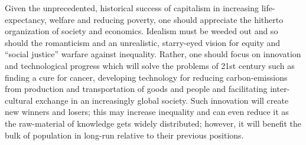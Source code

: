 \documentclass[12pt]{article}
\newcommand{\1}{\mathbbm 1}
\begin{document}
		Given the unprecedented, historical success of capitalism in increasing life-expectancy, welfare and reducing poverty, one should appreciate the hitherto organization of society and economics. Idealism must be weeded out and so should the romanticism and an unrealistic, starry-eyed vision for equity and ``social justice'' warfare against inequality. Rather, one should focus on innovation and technological progress which will solve the problems of 21st century such as finding a cure for cancer, developing technology for reducing carbon-emissions from production and transportation of goods and people and facilitating inter-cultural exchange in an increasingly global society. Such innovation will create new winners and losers; this may increase inequality and can even reduce it as the raw-material of knowledge gets widely distributed; however, it will benefit the bulk of population in long-run relative to their previous positions.
	
		\newpage
		
		

		\singlespacing
		
		
		\clearpage
		
		
		
		
		
		
		\newpage
		
		
		
		
		
		
		
		
		
		
		
		
		
		
		
	
\end{document}
